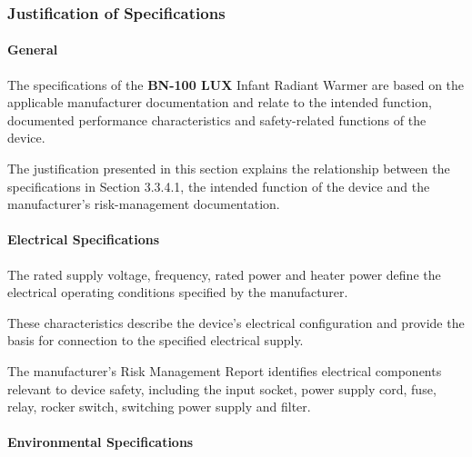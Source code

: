 
\hypertarget{p3-3-4-5}{}

\subsubsection{Justification of Specifications}

\paragraph{General}

The specifications of the \textbf{BN-100 LUX} Infant Radiant Warmer
are based on the applicable manufacturer documentation and relate
to the intended function, documented performance characteristics
and safety-related functions of the device.

The justification presented in this section explains the
relationship between the specifications in Section 3.3.4.1, the
intended function of the device and the manufacturer's
risk-management documentation.


\paragraph{Electrical Specifications}

The rated supply voltage, frequency, rated power and heater power
define the electrical operating conditions specified by the
manufacturer.

These characteristics describe the device's electrical
configuration and provide the basis for connection to the specified
electrical supply.

The manufacturer's Risk Management Report identifies electrical
components relevant to device safety, including the input socket,
power supply cord, fuse, relay, rocker switch, switching power
supply and filter.


\paragraph{Environmental Specifications}

